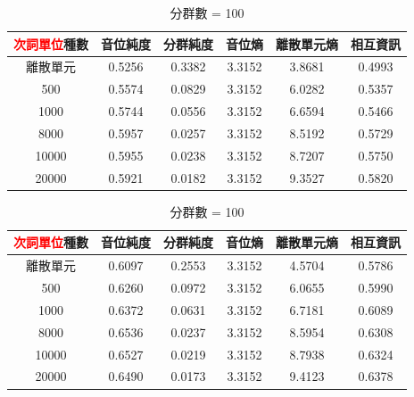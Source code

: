     {
        \begin{table}[!htbp]
            \centering

            \begin{subtable}[t]{\textwidth}
                \centering
                \begin{tabular}{|c|c|c|c|c|c|} \hline
                    \textcolor{red}{次詞單位}種數 & 音位純度   & 分群純度   & 音位熵    & 離散單元熵  & 相互資訊   \\ \hline
                    離散單元 & 0.5256 & 0.3382 & 3.3152 & 3.8681 & 0.4993 \\ \hline
                        500  & 0.5574 & 0.0829 & 3.3152 & 6.0282 & 0.5357 \\ \hline %
                    1000  & 0.5744 & 0.0556 & 3.3152 & 6.6594 & 0.5466 \\ \hline %
                    8000  & 0.5957 & 0.0257 & 3.3152 & 8.5192 & 0.5729 \\ \hline %
                    10000  & 0.5955 & 0.0238 & 3.3152 & 8.7207 & 0.5750 \\ \hline %
                    20000  & 0.5921 & 0.0182 & 3.3152 & 9.3527 & 0.5820 \\ \hline %
                \end{tabular}
                \caption{分群數 = 50}
                \label{tab:ch4-hubert-phn-clu050-}
            \end{subtable}

            \vspace{0.5cm}
            
            \begin{subtable}[t]{\textwidth}
                \centering
                \begin{tabular}{|c|c|c|c|c|c|} \hline
                    \textcolor{red}{次詞單位}種數 & 音位純度   & 分群純度   & 音位熵    & 離散單元熵  & 相互資訊   \\ \hline
                    離散單元 & 0.6097 & 0.2553 & 3.3152 & 4.5704 & 0.5786 \\ \hline
                        500  & 0.6260 & 0.0972 & 3.3152 & 6.0655 & 0.5990 \\ \hline %
                    1000  & 0.6372 & 0.0631 & 3.3152 & 6.7181 & 0.6089 \\ \hline %
                    8000  & 0.6536 & 0.0237 & 3.3152 & 8.5954 & 0.6308 \\ \hline %
                    10000  & 0.6527 & 0.0219 & 3.3152 & 8.7938 & 0.6324 \\ \hline %
                    20000  & 0.6490 & 0.0173 & 3.3152 & 9.4123 & 0.6378 \\ \hline %
                \end{tabular}
                \caption{分群數 = 100}
                \label{tab:ch4-hubert-phn-clu100-}
            \end{subtable}


\end{table}}
